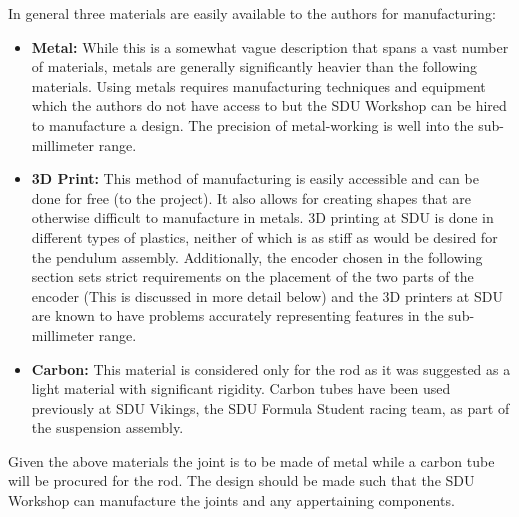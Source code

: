 In general three materials are easily available to the authors for manufacturing:
\begin{itemize}
	\item \textbf{Metal:} While this is a somewhat vague description that spans a vast number of materials, metals are generally significantly heavier than the following materials.
	Using metals requires manufacturing techniques and equipment which the authors do not have access to but the SDU Workshop can be hired to manufacture a design.
	The precision of metal-working is well into the sub-millimeter range.
	\item \textbf{3D Print:} This method of manufacturing is easily accessible and can be done for free (to the project). 
	It also allows for creating shapes that are otherwise difficult to manufacture in metals.
	3D printing at SDU is done in different types of plastics, neither of which is as stiff as would be desired for the pendulum assembly.
	Additionally, the encoder chosen in the following section sets strict requirements on the placement of the two parts of the encoder (This is discussed in more detail below) and the 3D printers at SDU are known to have problems accurately representing features in the sub-millimeter range.
	\item \textbf{Carbon:} This material is considered only for the rod as it was suggested as a light material with significant rigidity.
	Carbon tubes have been used previously at SDU Vikings, the SDU Formula Student racing team, as part of the suspension assembly.
\end{itemize}
Given the above materials the joint is to be made of metal while a carbon tube will be procured for the rod.
The design should be made such that the SDU Workshop can manufacture the joints and any appertaining components.

